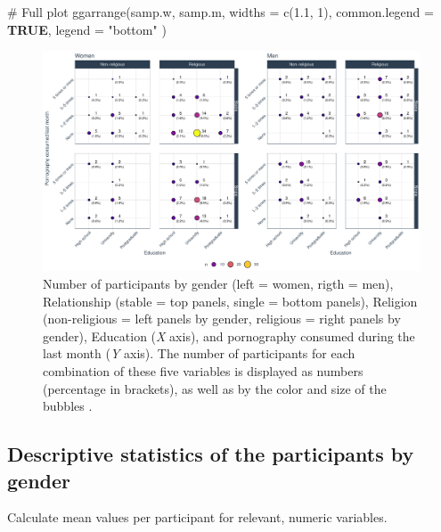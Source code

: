 \documentclass[
  bookmarksnumbered]{article}
\newenvironment{Shaded}{\begin{snugshade}}{\end{snugshade}}
\newcommand{\AttributeTok}[1]{\textcolor[rgb]{0.80,0.80,0.80}{#1}}
\newcommand{\CommentTok}[1]{\textcolor[rgb]{0.50,0.62,0.50}{#1}}
\newcommand{\ConstantTok}[1]{\textcolor[rgb]{0.86,0.64,0.64}{\textbf{#1}}}
\newcommand{\DecValTok}[1]{\textcolor[rgb]{0.86,0.86,0.80}{#1}}
\newcommand{\FloatTok}[1]{\textcolor[rgb]{0.75,0.75,0.82}{#1}}
\newcommand{\FunctionTok}[1]{\textcolor[rgb]{0.94,0.94,0.56}{#1}}
\newcommand{\NormalTok}[1]{\textcolor[rgb]{0.80,0.80,0.80}{#1}}
\newcommand{\StringTok}[1]{\textcolor[rgb]{0.80,0.58,0.58}{#1}}
\begin{document}
\begin{Shaded}
\begin{Highlighting}[]
\CommentTok{\# Full plot}
\FunctionTok{ggarrange}\NormalTok{(samp.w, samp.m,}
  \AttributeTok{widths =} \FunctionTok{c}\NormalTok{(}\FloatTok{1.1}\NormalTok{, }\DecValTok{1}\NormalTok{),}
  \AttributeTok{common.legend =} \ConstantTok{TRUE}\NormalTok{,}
  \AttributeTok{legend =} \StringTok{"bottom"}
\NormalTok{)}
\end{Highlighting}
\end{Shaded}

\begin{figure}
\centering
\includegraphics{Sexual_Desire_Arousal_V2_files/figure-latex/sample-plot-1.pdf}
\caption{\label{fig:sample-plot}Number of participants by gender (left = women, rigth = men), Relationship (stable = top panels, single = bottom panels), Religion (non-religious = left panels by gender, religious = right panels by gender), Education (\emph{X} axis), and pornography consumed during the last month (\emph{Y} axis). The number of participants for each combination of these five variables is displayed as numbers (percentage in brackets), as well as by the color and size of the bubbles .}
\end{figure}

\subsection{Descriptive statistics of the participants by gender}\label{descriptive-statistics-of-the-participants-by-gender}

Calculate mean values per participant for relevant, numeric variables.
\end{document}
